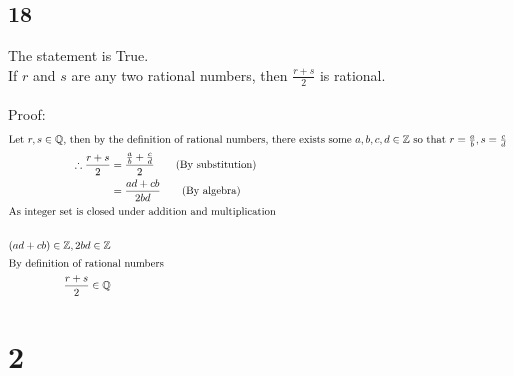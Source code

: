 \documentclass{article}
\begin{document}
\subsection{18}
The statement is True.\\
If $r$  and $s$ are any two rational numbers, then $\frac{r + s}{2}$ is rational.\\\\
Proof:
\begin{align*}
    \intertext{Let $r,s \in \mathbb{Q}$, then by the definition of rational numbers, there exists some $a,b,c,d \in \mathbb{Z}$ so that $r = \frac{a}{b}, s = \frac{c}{d}$ }
    \therefore \frac{r+s}{2} &= \frac{\frac{a}{b} + \frac{c}{d}}{2}\tag{By substitution}\\
    &= \frac{ad + cb}{2bd}\tag{By algebra}\\
    \intertext{As integer set is closed under addition and multiplication}\\
    (ad+cb) \in \mathbb{Z}, 2bd \in \mathbb{Z}\\
    \intertext{By definition of rational numbers} \frac{r + s}{2} \in \mathbb{Q}
\end{align*}


\section{2}
\end{document}
